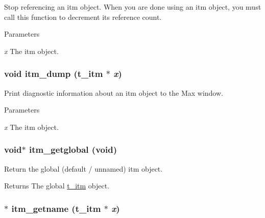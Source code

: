 Stop referencing an itm object. When you are done using an itm object, you must call this function to decrement its reference count.


\begin{DoxyParams}{Parameters}
\item[{\em x}]The itm object. \end{DoxyParams}
\hypertarget{group__time_gab8fb2f5156bb6df433d509d721a8cefd}{
\subsubsection[{itm\_\-dump}]{\setlength{\rightskip}{0pt plus 5cm}void itm\_\-dump ({\bf t\_\-itm} $\ast$ {\em x})}}
\label{group__time_gab8fb2f5156bb6df433d509d721a8cefd}


Print diagnostic information about an itm object to the Max window. 
\begin{DoxyParams}{Parameters}
\item[{\em x}]The itm object. \end{DoxyParams}
\hypertarget{group__time_ga182b0bd45ff72d9ddccebd8cc9d552d1}{
\subsubsection[{itm\_\-getglobal}]{\setlength{\rightskip}{0pt plus 5cm}void$\ast$ itm\_\-getglobal (void)}}
\label{group__time_ga182b0bd45ff72d9ddccebd8cc9d552d1}


Return the global (default / unnamed) itm object. \begin{DoxyReturn}{Returns}
The global \hyperlink{group__time_gac656fa1f920c69cf77e6631bcec53077}{t\_\-itm} object. 
\end{DoxyReturn}
\hypertarget{group__time_ga0daf42c6199b38f486998f2e5d2c8a11}{
\subsubsection[{itm\_\-getname}]{$\ast$ itm\_\-getname ({\bf t\_\-itm} $\ast$ {\em x})}}
\label{group__time_ga0daf42c6199b38f486998f2e5d2c8a11}


